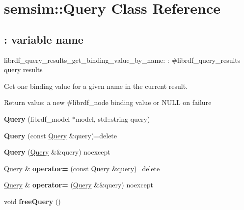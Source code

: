 \hypertarget{classsemsim_1_1Query}{}\section{semsim\+:\+:Query Class Reference}
\label{classsemsim_1_1Query}
\subsection*{\+: variable name}
\label{_amgrp7ca1d8b10bb02d408ac42bd6ecaaf12b}%
librdf\+\_\+query\+\_\+results\+\_\+get\+\_\+binding\+\_\+value\+\_\+by\+\_\+name\+: \+: \#librdf\+\_\+query\+\_\+results query results

Get one binding value for a given name in the current result.

Return value\+: a new \#librdf\+\_\+node binding value or N\+U\+LL on failure \begin{DoxyCompactItemize}
\item 
\mbox{\label{classsemsim_1_1Query_adc98ca404ecad9f4fd4f718c92721211}} 
{\bfseries Query} (librdf\+\_\+model $\ast$model, std\+::string query)
\item 
\mbox{\label{classsemsim_1_1Query_a16a28232cd8bf950b1e76e017ec93561}} 
{\bfseries Query} (const \hyperlink{classsemsim_1_1Query}{Query} \&query)=delete
\item 
\mbox{\label{classsemsim_1_1Query_a1edd5ec1cd5cb057121fa0b35fad48ec}} 
{\bfseries Query} (\hyperlink{classsemsim_1_1Query}{Query} \&\&query) noexcept
\item 
\mbox{\label{classsemsim_1_1Query_ae76fa75112392cfdc176c7a7ee6912f2}} 
\hyperlink{classsemsim_1_1Query}{Query} \& {\bfseries operator=} (const \hyperlink{classsemsim_1_1Query}{Query} \&query)=delete
\item 
\mbox{\label{classsemsim_1_1Query_a3b7646a5d2722ff4d1962c3f0a620882}} 
\hyperlink{classsemsim_1_1Query}{Query} \& {\bfseries operator=} (\hyperlink{classsemsim_1_1Query}{Query} \&\&query) noexcept
\item 
\mbox{\label{classsemsim_1_1Query_a8b74d77f2c4fbcd9800548aa4c4304ec}} 
void {\bfseries free\+Query} ()

\end{DoxyCompactItemize}
